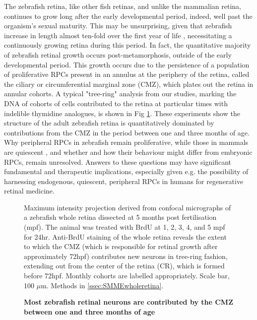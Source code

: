 The zebrafish retina, like other fish retinas, and unlike the mammalian retina, continues to grow long after the early developmental period, indeed, well past the organism's sexual maturity. This may be unsurprising, given that zebrafish increase in length almost ten-fold over the first year of life \cite{Parichy2009}, necessitating a continuously growing retina during this period. In fact, the quantitative majority of zebrafish retinal growth occurs post-metamorphosis, outside of the early developmental period. This growth occurs due to the persistence of a population of proliferative RPCs present in an annulus at the periphery of the retina, called the ciliary or circumferential marginal zone (CMZ), which plates out the retina in annular cohorts. A typical "tree-ring" analysis from our studies, marking the DNA of cohorts of cells contributed to the retina at particular times with indelible thymidine analogues, is shown in Fig \ref{RingFig}. These experiments show the structure of the adult zebrafish retina is quantitatively dominated by contributions from the CMZ in the period between one and three months of age. Why peripheral RPCs in zebrafish remain proliferative, while those in mammals are quiescent \cite{Tropepe2000}, and whether and how their behaviour might differ from embryonic RPCs, remain unresolved. Answers to these questions may have significant fundamental and therapeutic implications, especially given e.g. the possibility of harnessing endogenous, quiescent, peripheral RPCs in humans for regenerative retinal medicine.

\begin{figure}[!h]
\caption{{\bf Most zebrafish retinal neurons are contributed by the CMZ between one and three months of age}}
Maximum intensity projection derived from confocal micrographs of a zebrafish whole retina dissected at 5 months post fertilisation (mpf). The animal was treated with BrdU at 1, 2, 3, 4, and 5 mpf for 24hr. Anti-BrdU staining of the whole retina reveals the extent to which the CMZ (which is responsible for retinal growth after approximately 72hpf) contributes new neurons in tree-ring fashion, extending out from the center of the retina (CR), which is formed before 72hpf. Monthly cohorts are labelled appropriately. Scale bar, 100 $\mu$m.
Methods in \autoref{ssec:SMMEwholeretina}.
\label{RingFig}
\end{figure}

\FloatBarrier


